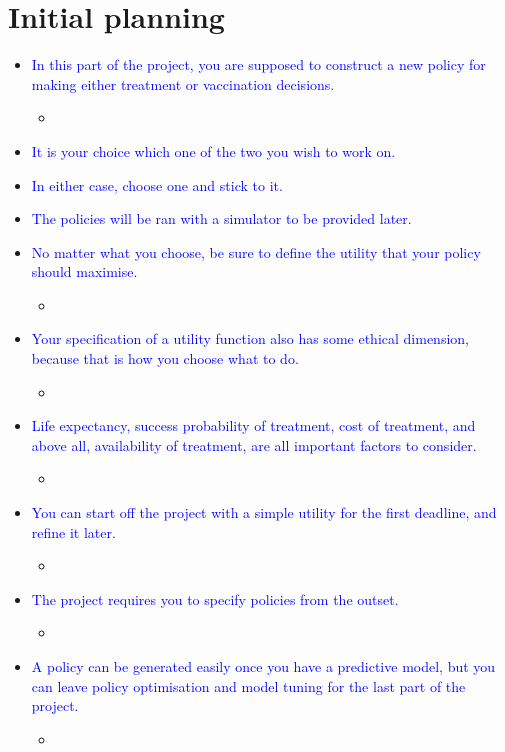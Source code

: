 
\section*{Initial planning}
\begin{itemize}
    \item \textcolor{blue}{In this part of the project, you are supposed to construct a new policy for making either treatment or vaccination decisions.}
        \begin{itemize}
            \item  
        \end{itemize}
    \item \textcolor{blue}{It is your choice which one of the two you wish to work on.}
    \item \textcolor{blue}{In either case, choose one and stick to it.}
    \item \textcolor{blue}{The policies will be ran with a simulator to be provided later.}
    \item \textcolor{blue}{No matter what you choose, be sure to define the utility that your policy should maximise.}
        \begin{itemize}
            \item 
        \end{itemize}
    \item \textcolor{blue}{Your specification of a utility function also has some ethical dimension, because that is how you choose what to do.}
        \begin{itemize}
            \item 
        \end{itemize}
    \item \textcolor{blue}{Life expectancy, success probability of treatment, cost of treatment,  and above all, availability of treatment, are all important factors to consider.}
        \begin{itemize}
            \item 
        \end{itemize}
    \item \textcolor{blue}{You can start off the project with a simple utility for the first deadline, and refine it later.}
        \begin{itemize}
            \item 
        \end{itemize}
    \item \textcolor{blue}{The project requires you to specify policies from the outset.}
        \begin{itemize}
            \item 
        \end{itemize}
    \item \textcolor{blue}{A policy can be generated easily once you have a predictive model, but you can leave policy optimisation and model tuning for the last part of the project.}
        \begin{itemize}
            \item 
        \end{itemize}
\end{itemize}